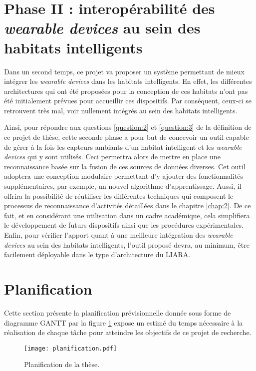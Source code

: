 \section{Phase II : interopérabilité des \textit{wearable devices} au sein des habitats intelligents}

Dans un second temps, ce projet va proposer un système permettant de mieux intégrer les \textit{wearable devices} dans les habitats intelligents. En effet, les différentes architectures qui ont été proposées pour la conception de ces habitats n’ont pas été initialement prévues pour accueillir ces dispositifs. Par conséquent, ceux-ci se retrouvent très mal, voir nullement intégrés au sein des habitats intelligents. 

Ainsi, pour répondre aux questions \ref{question:2} et \ref{question:3} de la définition de ce projet de thèse, cette seconde phase a pour but de concevoir un outil capable de gérer à la fois les capteurs ambiants d'un habitat intelligent et les \textit{wearable devices} qui y sont utilisés. Ceci permettra alors de mettre en place une reconnaissance basée sur la fusion de ces sources de données diverses. Cet outil adoptera une conception modulaire permettant d'y ajouter des fonctionnalités supplémentaires, par exemple, un nouvel algorithme d'apprentissage. Aussi, il offrira la possibilité de réutiliser les différentes techniques qui composent le processus de reconnaissance d'activités détaillées dans le chapitre \ref{chap:2}. De ce fait, et en considérant une utilisation dans un cadre académique, cela simplifiera le développement de futurs dispositifs ainsi que les procédures expérimentales. Enfin, pour vérifier l'apport quant à une meilleure intégration des \textit{wearable devices} au sein des habitats intelligents, l'outil proposé devra, au minimum, être facilement déployable dans le type d'architecture du \acs{LIARA}.

\section{Planification}

Cette section présente la planification prévisionnelle donnée sous forme de diagramme GANTT par la figure \ref{fig:planification} expose un estimé du temps nécessaire à la réalisation de chaque tâche pour atteindre les objectifs de ce projet de recherche. 

\begin{figure}[H]
    \begin{sideways}
     \begin{minipage}{.7\textheight}
        \texttt{[image: planification.pdf]}
     \end{minipage}
    \end{sideways}
    \centering
    \caption{Planification de la thèse.}
    \label{fig:planification}
\end{figure}
